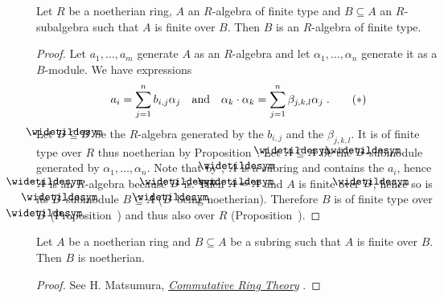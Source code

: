 \documentclass[a4paper,parskip=half,numbers=enddot, DIV=12]{scrreprt}
\begin{document}
	\begin{prop}
		Let $R$ be a noetherian ring, $A$ an $R$-algebra of finite type and $B\subseteq A$ an $R$-subalgebra such that $A$ is finite over $B$. Then $B$ is an $R$-algebra of finite type.
	\end{prop}
	\begin{proof}
		Let $a_1,\ldots,a_m$ generate $A$ as an $R$-algebra and let $\alpha_1,\ldots,\alpha_n$ generate it as a $B$-module. We have expressions		
		\begin{align}
		a_i =\sum_{j=1}^n b_{i,j} \alpha_j\quad\text{and}\quad
		\alpha_k\cdot \alpha_k = \sum_{j=1}^n \beta_{j,k,l} \alpha_j\;.\tag{$*$}\lbl{eq:Prop142*}
		\end{align}
		Let $\snake B\subseteq B$ be the $R$-algebra generated by the $b_{i,j}$ and the $\beta_{j,k,l}$. It is of finite type over $R$ thus noetherian by Proposition~. Let $\snake A \subseteq A$ be the $\snake B$-submodule generated by $\alpha_1,\ldots,\alpha_n$. Note that by  , $\snake A$ is a subring and contains the $a_i$, hence $\snake A$ is an $R$-algebra because $\snake B$ is. Then $\snake A=A$ and $A$ is finite over $\snake B$, hence so is its $\snake B$-submodule $B\subseteq A$ ($\snake B$ being noetherian). Therefore $B$ is of finite type over $\snake B$ (Proposition~) and thus also over $R$ (Proposition~).
	\end{proof}
	\begin{prop}
		Let $A$ be a noetherian ring and $B\subseteq A$ be a subring such that $A$ is finite over $B$. Then $B$ is noetherian.
	\end{prop}
	\begin{proof}
		See H. Matsumura, \href{http://www.math.unam.mx/javier/Matsumura.pdf}{\emph{Commutative Ring Theory}} \cite[Theorem~3.7]{matsumuraCRT}.
	\end{proof}
\end{document}
